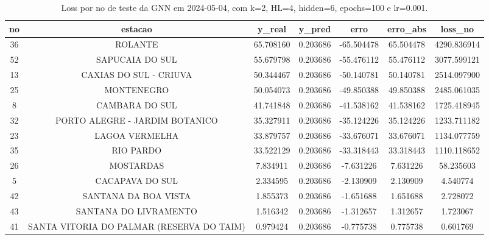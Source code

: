 \begin{table}[h]
\centering
\caption{Loss por no de teste da GNN em 2024-05-04, com k=2, HL=4, hidden=6, epochs=100 e lr=0.001.}
\label{tab:gnn_loss_k2_hl4_h6_e100_d20240504}
\begin{tabular}{ccccccc}
\toprule
no & estacao & y\_real & y\_pred & erro & erro\_abs & loss\_no \\
\midrule
36 & ROLANTE & 65.708160 & 0.203686 & -65.504478 & 65.504478 & 4290.836914 \\
52 & SAPUCAIA DO SUL & 55.679798 & 0.203686 & -55.476112 & 55.476112 & 3077.599121 \\
13 & CAXIAS DO SUL - CRIUVA & 50.344467 & 0.203686 & -50.140781 & 50.140781 & 2514.097900 \\
25 & MONTENEGRO & 50.054073 & 0.203686 & -49.850388 & 49.850388 & 2485.061035 \\
8 & CAMBARA DO SUL & 41.741848 & 0.203686 & -41.538162 & 41.538162 & 1725.418945 \\
32 & PORTO ALEGRE - JARDIM BOTANICO & 35.327911 & 0.203686 & -35.124226 & 35.124226 & 1233.711182 \\
23 & LAGOA VERMELHA & 33.879757 & 0.203686 & -33.676071 & 33.676071 & 1134.077759 \\
35 & RIO PARDO & 33.522129 & 0.203686 & -33.318443 & 33.318443 & 1110.118652 \\
26 & MOSTARDAS & 7.834911 & 0.203686 & -7.631226 & 7.631226 & 58.235603 \\
5 & CACAPAVA DO SUL & 2.334595 & 0.203686 & -2.130909 & 2.130909 & 4.540774 \\
42 & SANTANA DA BOA VISTA & 1.855373 & 0.203686 & -1.651688 & 1.651688 & 2.728072 \\
43 & SANTANA DO LIVRAMENTO & 1.516342 & 0.203686 & -1.312657 & 1.312657 & 1.723067 \\
41 & SANTA VITORIA DO PALMAR (RESERVA DO TAIM) & 0.979424 & 0.203686 & -0.775738 & 0.775738 & 0.601769 \\
\bottomrule
\end{tabular}
\end{table}
